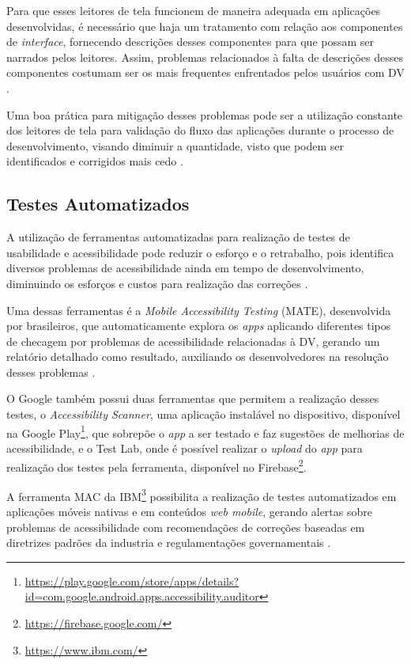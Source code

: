 Para que esses leitores de tela funcionem de maneira adequada em aplicações desenvolvidas, é necessário que haja um tratamento
com relação aos componentes de \emph{interface}, fornecendo descrições desses componentes para que possam ser narrados pelos leitores. Assim,
problemas relacionados à falta de descrições desses componentes costumam ser os mais frequentes enfrentados pelos usuários com DV
\cite{Vendome201941,Christoph2020,Shera2021285}.

Uma boa prática para mitigação desses problemas pode ser a utilização constante dos leitores de tela para validação do fluxo das aplicações durante
o processo de desenvolvimento, visando diminuir a quantidade, visto que podem ser identificados e corrigidos mais cedo \cite{Tomlinson2016377}.

\subsection{Testes Automatizados}

A utilização de ferramentas automatizadas para realização de testes de usabilidade e acessibilidade pode reduzir o esforço
e o retrabalho, pois identifica diversos problemas de acessibilidade ainda em tempo de desenvolvimento, diminuindo os esforços e custos para
realização das correções \cite{Christoph2020}.

Uma dessas ferramentas é a \emph{Mobile Accessibility Testing} (MATE), desenvolvida por brasileiros, que automaticamente explora os \emph{apps}
aplicando diferentes tipos de checagem por problemas de acessibilidade relacionadas à DV, gerando um relatório detalhado como resultado, auxiliando
os desenvolvedores na resolução desses problemas \cite{Eler2018AutomatedAT}.

O Google também possui duas ferramentas que permitem a realização desses testes, o \emph{Accessibility Scanner}, uma aplicação instalável no dispositivo,
disponível na Google Play\footnote{\url{https://play.google.com/store/apps/details?id=com.google.android.apps.accessibility.auditor}}, que sobrepõe o
\emph{app} a ser testado e faz sugestões de melhorias de acessibilidade, e o Test Lab, onde é possível realizar o \emph{upload} do \emph{app} para 
realização dos testes pela ferramenta, disponível no Firebase\footnote{\url{https://firebase.google.com/}}.

A ferramenta MAC da IBM\footnote{\url{https://www.ibm.com/}} possibilita a realização de testes automatizados em aplicações
móveis nativas e em conteúdos \emph{web mobile}, gerando alertas sobre problemas de acessibilidade com recomendações de
correções baseadas em diretrizes padrões da industria e regulamentações governamentais \cite{patil2016enhanced,Yan2019}.

